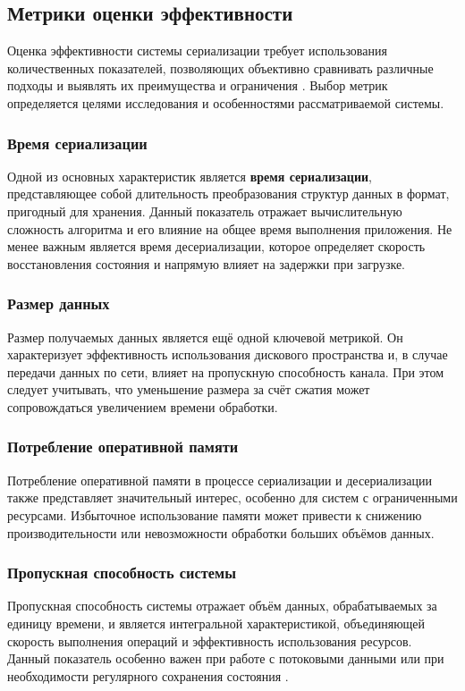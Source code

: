 \documentclass[coursework]{SCWorks}
\begin{document}
\subsection{Метрики оценки эффективности}

Оценка эффективности системы сериализации требует использования количественных показателей, позволяющих объективно сравнивать различные подходы и выявлять их преимущества и ограничения \cite{jain1991art}. Выбор метрик определяется целями исследования и особенностями рассматриваемой системы.

\subsubsection{Время сериализации}
Одной из основных характеристик является \textbf{время сериализации}, представляющее собой длительность преобразования структур данных в формат, пригодный для хранения. Данный показатель отражает вычислительную сложность алгоритма и его влияние на общее время выполнения приложения. Не менее важным является время десериализации, которое определяет скорость восстановления состояния и напрямую влияет на задержки при загрузке.

\subsubsection{Размер данных}
Размер получаемых данных является ещё одной ключевой метрикой. Он характеризует эффективность использования дискового пространства и, в случае передачи данных по сети, влияет на пропускную способность канала. При этом следует учитывать, что уменьшение размера за счёт сжатия может сопровождаться увеличением времени обработки\cite{kleppmann2017designing}.

\subsubsection{Потребление оперативной памяти}
Потребление оперативной памяти в процессе сериализации и десериализации также представляет значительный интерес, особенно для систем с ограниченными ресурсами. Избыточное использование памяти может привести к снижению производительности или невозможности обработки больших объёмов данных.

\subsubsection{Пропускная способность системы}
Пропускная способность системы отражает объём данных, обрабатываемых за единицу времени, и является интегральной характеристикой, объединяющей скорость выполнения операций и эффективность использования ресурсов. Данный показатель особенно важен при работе с потоковыми данными или при необходимости регулярного сохранения состояния \cite{gregg2013systems}.
\end{document}
